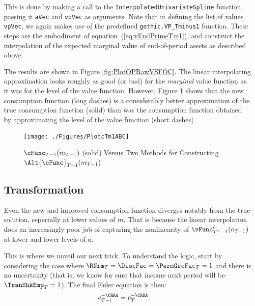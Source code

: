 \documentclass[titlepage, headings=optiontotocandhead]{\econtex}
\begin{document}
This is done by making a call to the \texttt{InterpolatedUnivariateSpline} function,
passing it \texttt{aVec} and \texttt{vpVec} as arguments. Note that in defining the list of values \texttt{vpVec}, we again makes use of the
predefined \texttt{gothic.VP\_Tminus1} function. These steps are the embodiment of equation~(\ref{eq:vEndPrimeTm1}), and construct the
interpolation of the expected marginal value of end-of-period assets as described above.

The results are
shown in Figure \ref{fig:PlotOPRawVSFOC}.  The linear
interpolating approximation looks roughly as good (or bad) for the
\textit{marginal} value function as it was for the level of the value
function. However, Figure \ref{fig:PlotcTm1ABC} shows that the new
consumption function (long dashes) is a considerably better
approximation of the true consumption function (solid) than was the
consumption function obtained by approximating the level of the
value function (short dashes).

\hypertarget{PlotcTm1ABC}{}
\begin{figure}
  \centerline{\texttt{[image: ./Figures/PlotcTm1ABC]}}
  \caption{$\cFunc_{T-1}({m}_{T-1})$ (solid) Versus Two Methods for Constructing $\Alt{\cFunc}_{T-1}({m}_{T-1})$}
  \label{fig:PlotcTm1ABC}
\end{figure}

\hypertarget{Transformation}{}
\subsection{Transformation}\label{subsec:transformation}

Even the new-and-improved consumption function diverges notably from the true
solution, especially at lower values of ${m}$.  That is because the
linear interpolation does an increasingly poor job of capturing the
nonlinearity of $\vFunc_{T^{+}-1}^{{a}}({a}_{T-1})$ at
lower and lower levels of ${a}$.

This is where we unveil our next trick.  To understand the logic,
start by considering the case where $\RNrm_{T} = \DiscFac =
\PermGroFac_{T} = 1$ and there is no uncertainty
 (that is, we know for sure that income next period
will be $\TranShkEmp_{T} = 1$).  The final Euler equation is then:
\begin{equation}\begin{gathered}\begin{aligned}
      {c}_{T-1}^{-\CRRA}  & = {c}_{T}^{-\CRRA}.
    \end{aligned}\end{gathered}\end{equation}
\end{document}
